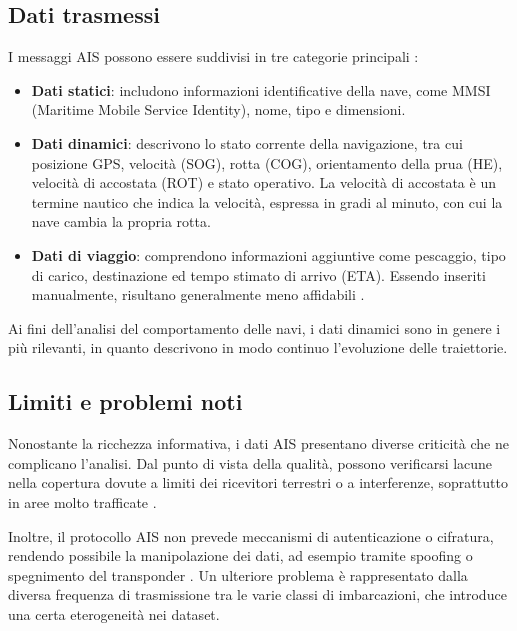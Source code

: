 \subsection{Dati trasmessi}

I messaggi AIS possono essere suddivisi in tre categorie principali \cite{riassuntone}:

\begin{itemize}
\item \textbf{Dati statici}: includono informazioni identificative della nave, come MMSI (Maritime Mobile Service Identity), nome, tipo e dimensioni.
\item \textbf{Dati dinamici}: descrivono lo stato corrente della navigazione, tra cui posizione GPS, velocità (SOG), rotta (COG), orientamento della prua (HE), velocità di accostata (ROT) e stato operativo. La velocità di accostata è un termine nautico che indica la velocità, espressa in gradi al minuto, con cui la nave cambia la propria rotta.
\item \textbf{Dati di viaggio}: comprendono informazioni aggiuntive come pescaggio, tipo di carico, destinazione ed tempo stimato di arrivo (ETA). Essendo inseriti manualmente, risultano generalmente meno affidabili \cite{pallotta}.
\end{itemize}

Ai fini dell’analisi del comportamento delle navi, i dati dinamici sono in genere i più rilevanti, 
in quanto descrivono in modo continuo l’evoluzione delle traiettorie.

\subsection{Limiti e problemi noti}

Nonostante la ricchezza informativa, i dati AIS presentano diverse criticità che ne complicano l’analisi. 
Dal punto di vista della qualità, possono verificarsi lacune nella copertura dovute a limiti dei ricevitori 
terrestri o a interferenze, soprattutto in aree molto trafficate \cite{pallotta}.

Inoltre, il protocollo AIS non prevede meccanismi di autenticazione o cifratura, 
rendendo possibile la manipolazione dei dati, ad esempio tramite spoofing o spegnimento del transponder \cite{riassuntone}. 
Un ulteriore problema è rappresentato dalla diversa frequenza di trasmissione tra le varie classi di 
imbarcazioni, che introduce una certa eterogeneità nei dataset.


